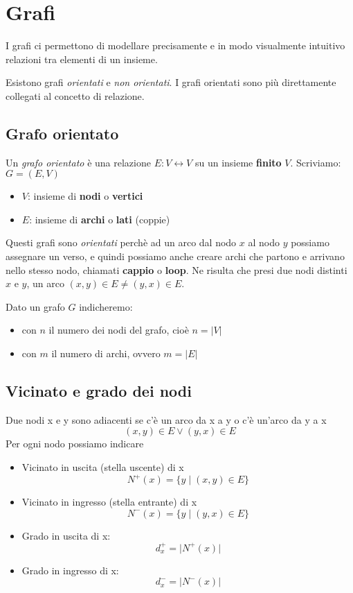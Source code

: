\documentclass{article}
\begin{document}
\pagebreak

\section{Grafi}
I grafi ci permettono di modellare precisamente e in modo visualmente intuitivo relazioni tra elementi di un insieme.

Esistono grafi \emph{orientati} e \emph{non orientati}. I grafi orientati sono più direttamente collegati al concetto di relazione.

\subsection{Grafo orientato}
Un \emph{grafo orientato} è una relazione \(E: V \leftrightarrow V\) su un insieme \textbf{finito} \(V\). Scriviamo: \(G = (E,V)\)
\begin{itemize}
    \item \(V\): insieme di \textbf{nodi} o \textbf{vertici}
    \item \(E\): insieme di \textbf{archi} o \textbf{lati} (coppie)
\end{itemize}

Questi grafi sono \emph{orientati} perchè ad un arco dal nodo \(x\) al nodo \(y\) possiamo assegnare un verso, e quindi possiamo anche creare archi che partono e arrivano nello stesso nodo, chiamati \textbf{cappio} o \textbf{loop}. Ne risulta che presi due nodi distinti \(x\) e \(y\), un arco \((x,y) \in E \neq (y,x) \in E\).

Dato un grafo \(G\) indicheremo:
\begin{itemize}
    \item con \(n\) il numero dei nodi del grafo, cioè \(n = \lvert V\rvert\)
    \item con \(m\) il numero di archi, ovvero \(m = \lvert E\rvert\)
\end{itemize}

\subsection{Vicinato e grado dei nodi}
Due nodi x e y sono adiacenti se c'è un arco da x a y o c'è un'arco da y a x
\[(x,y) \in E \lor (y,x) \in E\]
Per ogni nodo possiamo indicare
\begin{itemize}
    \item Vicinato in uscita (stella uscente) di x 
    \[N^+(x) = \{y \mid (x,y) \in E\}\]
    \item Vicinato in ingresso (stella entrante) di x 
    \[N^-(x) = \{y \mid (y,x) \in E\}\]
    \item Grado in uscita di x:
    \[d^+_x = \lvert N^+(x) \rvert\]
    \item Grado in ingresso di x:
    \[d^-_x = \lvert N^-(x) \rvert\]
\end{itemize}
\end{document}
